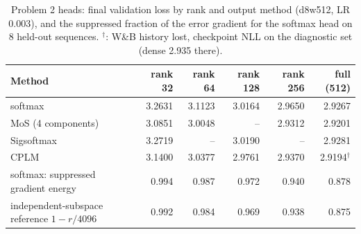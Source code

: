 \begin{table}[H]\centering\small\caption{Problem 2 heads: final validation loss by rank and output method (d8w512, LR 0.003), and the suppressed fraction of the error gradient for the softmax head on 8 held-out sequences. $^\dagger$: W\&B history lost, checkpoint NLL on the diagnostic set (dense 2.935 there).}\label{tab:p2grid}
\begin{tabular}{lrrrrr}\toprule
Method & rank 32 & rank 64 & rank 128 & rank 256 & full (512) \\ \midrule
softmax & 3.2631 & 3.1123 & 3.0164 & 2.9650 & 2.9267 \\
MoS (4 components) & 3.0851 & 3.0048 & -- & 2.9312 & 2.9201 \\
Sigsoftmax & 3.2719 & -- & 3.0190 & -- & 2.9281 \\
CPLM & 3.1400 & 3.0377 & 2.9761 & 2.9370 & 2.9194$^\dagger$ \\
\midrule softmax: suppressed gradient energy & 0.994 & 0.987 & 0.972 & 0.940 & 0.878 \\
independent-subspace reference $1-r/4096$ & 0.992 & 0.984 & 0.969 & 0.938 & 0.875 \\
\bottomrule\end{tabular}\end{table}